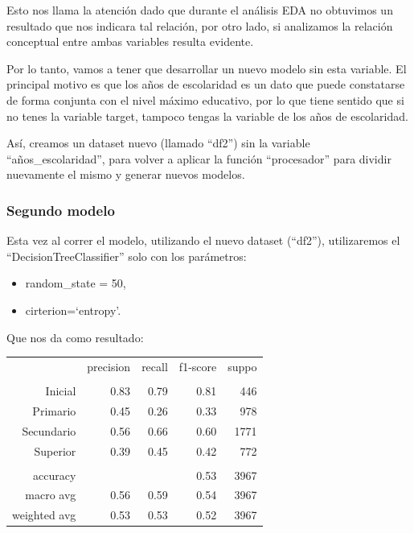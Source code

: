 \documentclass[a4paper]{article}
\begin{document}

            Esto nos llama la atención dado que durante el análisis EDA no obtuvimos un resultado que nos indicara tal relación, por otro lado, si analizamos la relación conceptual entre ambas variables resulta evidente.

            Por lo tanto, vamos a tener que desarrollar un nuevo modelo sin esta variable. El principal motivo es que los años de escolaridad es un dato que puede constatarse de forma conjunta con el nivel máximo educativo, por lo que tiene sentido que si no tenes la variable target, tampoco tengas la variable de los años de escolaridad.

            Así, creamos un dataset nuevo (llamado ``df2'') sin la variable ``años\_escolaridad'', para volver a aplicar la función ``procesador'' para dividir nuevamente el mismo y generar nuevos modelos.

        \subsubsection{Segundo modelo}

            Esta vez al correr el modelo, utilizando el nuevo dataset (``df2''), utilizaremos el ``DecisionTreeClassifier'' solo con los parámetros:
            \begin{itemize}
                \item random\_state = 50,
                \item cirterion=`entropy'.
            \end{itemize}
            Que nos da como resultado:  

            \begin{table}[!ht]
                \centering
                \begin{tabular}{rrrrr}
                    ~ & precision & recall & f1-score & suppo \\
                    & & & & \\
                    Inicial    & 0.83 & 0.79 & 0.81 & 446 \\
                    Primario   & 0.45 & 0.26 & 0.33 & 978 \\
                    Secundario & 0.56 & 0.66 & 0.60 & 1771 \\
                    Superior   & 0.39 & 0.45 & 0.42 & 772 \\
                    & & & & \\
                    accuracy & & & 0.53 & 3967 \\
                    macro avg & 0.56 & 0.59 & 0.54 & 3967 \\
                    weighted avg & 0.53 & 0.53 & 0.52 & 3967 \\
                \end{tabular}
            \end{table}
\end{document}
